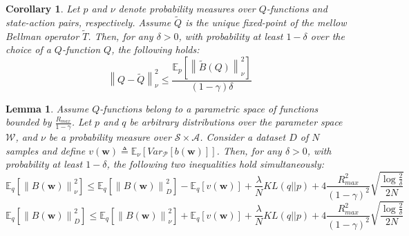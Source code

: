 \documentclass{article}
\newtheorem{lemma}{Lemma}
\newtheorem{corollary}{Corollary}
\newcommand{\wt}[1]{\widetilde{#1}}
\newcommand{\norm}[1]{\left\lVert #1 \right\rVert}
\begin{document}
\begin{corollary}\label{cor:diff-q}
Let $p$ and $\nu$ denote probability measures over $Q$-functions and state-action pairs, respectively. Assume $\wt{Q}$ is the unique fixed-point of the mellow Bellman operator $\wt{T}$. Then, for any $\delta > 0$, with probability at least $1 - \delta$ over the choice of a $Q$-function $Q$, the following holds:
\begin{equation}
\norm{Q - \wt{Q}}_{\nu}^2 \leq \frac{\mathbb{E}_p\left[ \norm{\wt{B}(Q)}_{\nu}^2 \right]}{(1-\gamma)\delta}
\end{equation}
\end{corollary}

\begin{lemma}\label{lemma:l2}
Assume $Q$-functions belong to a parametric space of functions bounded by $\frac{R_{max}}{1-\gamma}$. Let $p$ and $q$ be arbitrary distributions over the parameter space $\mathcal{W}$, and $\nu$ be a probability measure over $\mathcal{S}\times\mathcal{A}$. Consider a dataset $D$ of $N$ samples and define $v(\bm{w}) \triangleq \mathbb{E}_{\nu}\left[Var_{\mathcal{P}}\left[b(\bm{w})\right]\right]$. Then, for any $\delta > 0$, with probability at least $1-\delta$, the following two inequalities hold simultaneously:
\begin{equation}\label{eq:lemma2-1}
\mathbb{E}_q\left[ \norm{B(\bm{w})}_{\nu}^2 \right ] \leq \mathbb{E}_q\left[ \norm{B(\bm{w})}_D^2 \right] - \mathbb{E}_q\left[ v(\bm{w}) \right] + \frac{\lambda}{N} KL(q||p) + 4\frac{R_{max}^2}{(1-\gamma)^2}\sqrt{\frac{\log\frac{2}{\delta}}{2N}}
\end{equation}
\begin{equation}\label{eq:lemma2-2}
\mathbb{E}_q\left[ \norm{B(\bm{w})}_D^2 \right] \leq \mathbb{E}_q\left[ \norm{B(\bm{w})}_{\nu}^2 \right ] + \mathbb{E}_q\left[ v(\bm{w}) \right] + \frac{\lambda}{N} KL(q||p) + 4\frac{R_{max}^2}{(1-\gamma)^2}\sqrt{\frac{\log\frac{2}{\delta}}{2N}}
\end{equation}
\end{lemma}
\end{document}
